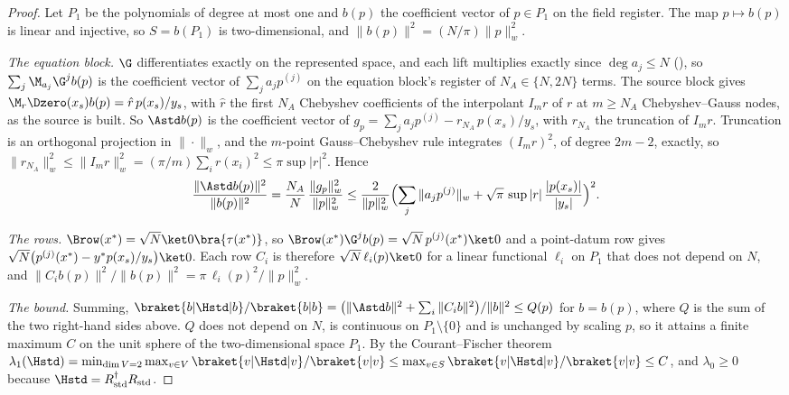 \begin{proof}
Let $P_1$ be the polynomials of degree at most one and $b(p)$ the coefficient vector of $p\in P_1$ on the field register. The map $p\mapsto b(p)$ is linear and injective, so $S=b(P_1)$ is two-dimensional, and $\|b(p)\|^2=(N/\pi)\|p\|_w^2$.

\emph{The equation block.} $\G$ differentiates exactly on the represented space, and each lift multiplies exactly since $\deg a_j\le N$ (), so $\sum_j\M_{a_j}\G^jb(p)$ is the coefficient vector of $\sum_ja_jp^{(j)}$ on the equation block's register of $N_A\in\{N,2N\}$ terms. The source block gives $\M_r\Dzero(x_s)b(p)=\hat r\,p(x_s)/y_s$, with $\hat r$ the first $N_A$ Chebyshev coefficients of the interpolant $I_mr$ of $r$ at $m\ge N_A$ Chebyshev--Gauss nodes, as the source is built. So $\Astd b(p)$ is the coefficient vector of $g_p=\sum_ja_jp^{(j)}-r_{N_A}\,p(x_s)/y_s$, with $r_{N_A}$ the truncation of $I_mr$. Truncation is an orthogonal projection in $\|\cdot\|_w$, and the $m$-point Gauss--Chebyshev rule integrates $(I_mr)^2$, of degree $2m-2$, exactly, so $\|r_{N_A}\|_w^2\le\|I_mr\|_w^2=(\pi/m)\sum_{i}r(x_i)^2\le\pi\sup|r|^2$. Hence
\begin{equation*}
    \frac{\|\Astd b(p)\|^2}{\|b(p)\|^2}=\frac{N_A}{N}\,\frac{\|g_p\|_w^2}{\|p\|_w^2}\le\frac{2}{\|p\|_w^2}\Bigl(\sum_j\|a_jp^{(j)}\|_w+\sqrt\pi\,\sup|r|\,\frac{|p(x_s)|}{|y_s|}\Bigr)^2 .
\end{equation*}

\emph{The rows.} $\Brow(x^*)=\sqrt N\ket0\bra{\tau(x^*)}$, so $\Brow(x^*)\G^jb(p)=\sqrt N\,p^{(j)}(x^*)\ket0$ and a point-datum row gives $\sqrt N\bigl(p^{(j)}(x^*)-y^*p(x_s)/y_s\bigr)\ket0$. Each row $C_i$ is therefore $\sqrt N\,\ell_i(p)\ket0$ for a linear functional $\ell_i$ on $P_1$ that does not depend on $N$, and $\|C_ib(p)\|^2/\|b(p)\|^2=\pi\,\ell_i(p)^2/\|p\|_w^2$.

\emph{The bound.} Summing, $\braket{b|\Hstd|b}/\braket{b|b}=\bigl(\|\Astd b\|^2+\sum_i\|C_ib\|^2\bigr)/\|b\|^2\le Q(p)$ for $b=b(p)$, where $Q$ is the sum of the two right-hand sides above. $Q$ does not depend on $N$, is continuous on $P_1\setminus\{0\}$ and is unchanged by scaling $p$, so it attains a finite maximum $C$ on the unit sphere of the two-dimensional space $P_1$. By the Courant--Fischer theorem $\lambda_1(\Hstd)=\min_{\dim V=2}\max_{v\in V}\braket{v|\Hstd|v}/\braket{v|v}\le\max_{v\in S}\braket{v|\Hstd|v}/\braket{v|v}\le C$, and $\lambda_0\ge0$ because $\Hstd=R_{\mathrm{std}}^\dagger R_{\mathrm{std}}$.


\end{proof}
